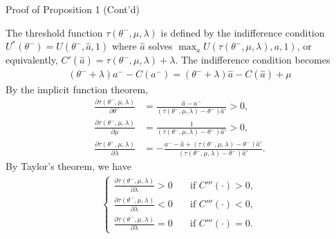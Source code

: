 \documentclass[9pt,aspectratio=1610]{beamer}
\begin{document}
\begin{frame}{Proof of Proposition 1 (Cont'd)}

The threshold function $\tau(\theta^-,\mu,\lambda)$ is defined by the indifference condition $U^*(\theta^-)= U(\theta^-,\hat{a},1)$ where $\hat{a}$ solves $\max_aU(\tau(\theta^-,\mu,\lambda),a,1)$, or equivalently, $C'(\hat{a}) = \tau(\theta^-,\mu,\lambda)+\lambda$. The indifference condition becomes
\begin{align*}
    (\theta^-+\lambda)a^- - C(a^-) = (\theta^-+\lambda)\hat{a} - C(\hat{a})+\mu 
\end{align*}
By the implicit function theorem, 
\begin{align*}
    \frac{\partial \tau(\theta^-,\mu,\lambda)}{\partial \theta^-} &= \frac{\hat{a}- a^-}{(\tau(\theta^-,\mu,\lambda) - \theta^-)\hat{a}'}>0,\\
    \frac{\partial \tau(\theta^-,\mu,\lambda)}{\partial \mu} &= \frac{1}{(\tau(\theta^-,\mu,\lambda) - \theta^-)\hat{a}'}>0,\\
    \frac{\partial \tau(\theta^-,\mu,\lambda)}{\partial \lambda} &= -\frac{a^--\hat{a} +(\tau(\theta^-,\mu,\lambda)-\theta^-)\hat{a}'}{(\tau(\theta^-,\mu,\lambda) - \theta^-)\hat{a}'}.
\end{align*}
By Taylor's theorem, we have 
\begin{align*} 
    \begin{cases}
        \frac{\partial \tau(\theta^-,\mu,\lambda)}{\partial \lambda}>0\quad &\text{if }C'''(\cdot)>0,\\
        \frac{\partial \tau(\theta^-,\mu,\lambda)}{\partial \lambda}<0\quad &\text{if }C'''(\cdot)<0,\\
        \frac{\partial \tau(\theta^-,\mu,\lambda)}{\partial \lambda}=0\quad &\text{if }C'''(\cdot)=0.
    \end{cases}
\end{align*}

\vspace{1em}
\hyperlink{prop1}{}
	
\end{frame}
\end{document}
